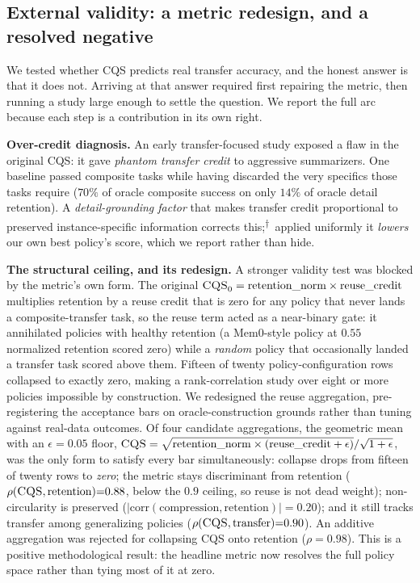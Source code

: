 \documentclass[11pt]{article}
\newcommand{\cqs}{\textsc{CQS}}
\newcommand{\cqsz}{\textsc{CQS}\ensuremath{_0}}
\newcommand{\controlled}{\textsuperscript{$\dagger$}}
\begin{document}
\subsection{External validity: a metric redesign, and a resolved negative}
\label{sec:validity}
We tested whether \cqs{} predicts real transfer accuracy, and the honest answer is that
it does not. Arriving at that answer required first repairing the metric, then running a
study large enough to settle the question. We report the full arc because each step is a
contribution in its own right.

\textbf{Over-credit diagnosis.} An early transfer-focused study exposed a flaw in the
original \cqs{}: it gave \emph{phantom transfer credit} to aggressive summarizers. One
baseline passed composite tasks while having discarded the very specifics those tasks
require ($70\%$ of oracle composite success on only $14\%$ of oracle detail retention).
A \emph{detail-grounding factor} that makes transfer credit proportional to preserved
instance-specific information corrects this;\controlled\ applied uniformly it
\emph{lowers} our own best policy's score, which we report rather than hide.

\textbf{The structural ceiling, and its redesign.} A stronger validity test was blocked
by the metric's own form. The original $\cqsz{} = \text{retention\_norm}\times
\text{reuse\_credit}$ multiplies retention by a reuse credit that is zero for any policy
that never lands a composite-transfer task, so the reuse term acted as a near-binary
gate: it annihilated policies with healthy retention (a Mem0-style policy at $0.55$
normalized retention scored zero) while a \emph{random} policy that occasionally landed a
transfer task scored above them. Fifteen of twenty policy-configuration rows collapsed to
exactly zero, making a rank-correlation study over eight or more policies impossible by
construction. We redesigned the reuse aggregation, pre-registering the acceptance bars on
oracle-construction grounds rather than tuning against real-data outcomes. Of four
candidate aggregations, the geometric mean with an $\epsilon = 0.05$ floor,
$\cqs{}=\sqrt{\text{retention\_norm}\times(\text{reuse\_credit}+\epsilon)}/\sqrt{1+\epsilon}$,
was the only form to satisfy every bar simultaneously: collapse drops from fifteen of
twenty rows to \emph{zero}; the metric stays discriminant from retention
($\rho(\cqs{},\text{retention}){=}0.88$, below the $0.9$ ceiling, so reuse is not dead
weight); non-circularity is preserved
($|\text{corr}(\text{compression},\text{retention})|{=}0.20$); and it still tracks
transfer among generalizing policies ($\rho(\cqs{},\text{transfer}){=}0.90$). An additive
aggregation was rejected for collapsing \cqs{} onto retention ($\rho{=}0.98$). This is a
positive methodological result: the headline metric now resolves the full policy space
rather than tying most of it at zero.
\end{document}
